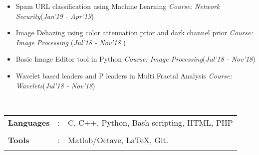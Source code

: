 \documentclass[10pt]{article}
\newcommand\hs{1.3mm}        %
\begin{document}
\colorbox{bl}{}
\vspace{-0.55cm}

\begin{itemize}[leftmargin=0.4cm]
\vspace{-0.05cm}

    \item Spam URL classification using Machine Learning
 \textpipe \hspace{0.2cm} \textit{Course: Network Security}\hspace{2.7cm}(\textit{Jan'19 - Apr'19})\vspace{-0.25cm}

     \item Image Dehazing using color attenuation prior and dark channel prior \textpipe \hspace{-0.1cm} \textit{Course: Image Processing} \hfill{(\textit{Jul’18 - Nov’18 })}\vspace{-0.25cm}

    \item Basic Image Editor tool in Python
  \textpipe \hspace{0.2cm} \textit{Course: Image Processing}\hspace{5.1cm}(\textit{Jul'18 - Nov'18})\vspace{-0.25cm}
    \item Wavelet based leaders and P leaders in Multi Fractal Analysis \textpipe \hspace{0.2cm}  \textit{Course: Wavelets}\hspace{1.95cm}(\textit{Jul'18 - Nov'18})\vspace{-0.25cm}

\end{itemize}

\vspace{0.05cm}

\colorbox{bl}{}\\
\begin{tabular}{m{1in}m{0.20in}m{4.5in}}
    \\[-3mm]
    \hspace{\hs} \textbf{\textbf{Languages}} &: & {{C, C++, Python, Bash scripting, HTML, PHP}} \\
    \\[-3.5mm]
    \hspace{\hs} \textbf{\textbf{Tools}} &: & {Matlab/Octave, \LaTeX, Git.}\\
    \\[-4mm]
\end{tabular}\\
\end{document}
